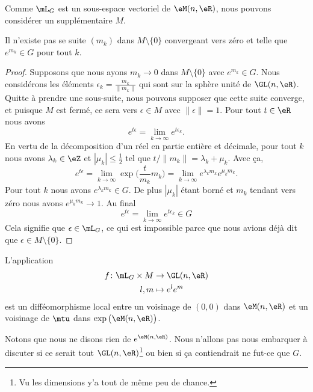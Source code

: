 Comme \( \mL_G\) est un sous-espace vectoriel de \( \eM(n,\eR)\), nous pouvons considérer un supplémentaire \( M\).

\begin{lemma}   \label{LemHOsbREC}
    Il n'existe pas se suite \( (m_k)\) dans \( M\setminus\{ 0 \}\) convergeant vers zéro et telle que \(  e^{m_k}\in G\) pour tout \( k\).
\end{lemma}

\begin{proof}
    Supposons que nous ayons \( m_k\to 0\) dans \( M\setminus\{ 0 \}\) avec \(  e^{m_k}\in G\). Nous considérons les éléments \( \epsilon_k=\frac{ m_k }{ \| m_k \| }\) qui sont sur la sphère unité de \(\GL(n,\eR)\). Quitte à prendre une sous-suite, nous pouvons supposer que cette suite converge, et puisque \( M\) est fermé, ce sera vers \( \epsilon\in M\) avec \( \| \epsilon \|=1\). Pour tout \( t\in \eR\) nous avons
    \begin{equation}
        e^{t\epsilon}=\lim_{k\to \infty}  e^{t\epsilon_k}.
    \end{equation}
    En vertu de la décomposition d'un réel en partie entière et décimale, pour tout \( k\) nous avons \( \lambda_k\in \eZ\) et \( | \mu_k |\leq \frac{ 1 }{2}\) tel que \( t/\| m_k \|=\lambda_k+\mu_k\). Avec ça,
    \begin{equation}
        e^{t\epsilon}=\lim_{k\to \infty}\exp\Big( \frac{ t }{ m_k }m_k \Big)=\lim_{k\to \infty}  e^{\lambda_km_k} e^{\mu_km_k}.
    \end{equation}
    Pour tout \( k\) nous avons \(  e^{\lambda_km_k}\in G\). De plus \( | \mu_k |\) étant borné et \( m_k\) tendant vers zéro nous avons \(  e^{\mu_km_k}\to 1\). Au final
    \begin{equation}
        e^{t\epsilon}=\lim_{k\to \infty}  e^{t\epsilon_k}\in G
    \end{equation}
    Cela signifie que \( \epsilon\in\mL_G\), ce qui est impossible parce que nous avions déjà dit que \( \epsilon\in M\setminus\{ 0 \}\).
\end{proof}

\begin{lemma}   \label{LemGGTtxdF}
    L'application
    \begin{equation}
        \begin{aligned}
            f\colon \mL_G\times M & \to \GL(n,\eR)          \\
                          l,m     & \mapsto  e^{l} e^{m}
        \end{aligned}
    \end{equation}
    est un difféomorphisme local entre un voisinage de \( (0,0)\) dans \( \eM(n,\eR)\) et un voisinage de \( \mtu\) dans \( \exp\big( \eM(n,\eR) \big)\).
\end{lemma}
Notons que nous ne disons rien de \(  e^{\eM(n,\eR)}\). Nous n'allons pas nous embarquer à discuter si ce serait tout \( \GL(n,\eR)\)\footnote{Vu les dimensions y'a tout de même peu de chance.} ou bien si ça contiendrait ne fut-ce que \( G\).

